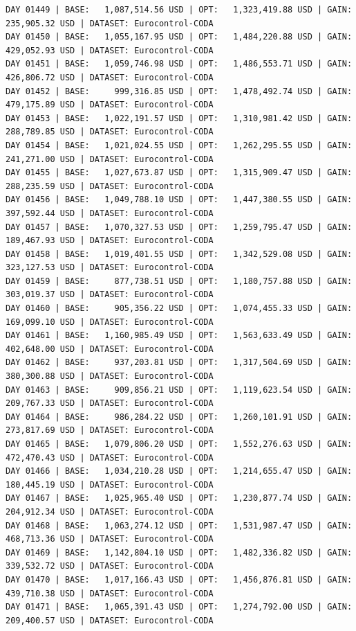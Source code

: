\documentclass[11pt,a4paper]{article}
\begin{document}
\begin{verbatim}
DAY 01449 | BASE:   1,087,514.56 USD | OPT:   1,323,419.88 USD | GAIN: 235,905.32 USD | DATASET: Eurocontrol-CODA
DAY 01450 | BASE:   1,055,167.95 USD | OPT:   1,484,220.88 USD | GAIN: 429,052.93 USD | DATASET: Eurocontrol-CODA
DAY 01451 | BASE:   1,059,746.98 USD | OPT:   1,486,553.71 USD | GAIN: 426,806.72 USD | DATASET: Eurocontrol-CODA
DAY 01452 | BASE:     999,316.85 USD | OPT:   1,478,492.74 USD | GAIN: 479,175.89 USD | DATASET: Eurocontrol-CODA
DAY 01453 | BASE:   1,022,191.57 USD | OPT:   1,310,981.42 USD | GAIN: 288,789.85 USD | DATASET: Eurocontrol-CODA
DAY 01454 | BASE:   1,021,024.55 USD | OPT:   1,262,295.55 USD | GAIN: 241,271.00 USD | DATASET: Eurocontrol-CODA
DAY 01455 | BASE:   1,027,673.87 USD | OPT:   1,315,909.47 USD | GAIN: 288,235.59 USD | DATASET: Eurocontrol-CODA
DAY 01456 | BASE:   1,049,788.10 USD | OPT:   1,447,380.55 USD | GAIN: 397,592.44 USD | DATASET: Eurocontrol-CODA
DAY 01457 | BASE:   1,070,327.53 USD | OPT:   1,259,795.47 USD | GAIN: 189,467.93 USD | DATASET: Eurocontrol-CODA
DAY 01458 | BASE:   1,019,401.55 USD | OPT:   1,342,529.08 USD | GAIN: 323,127.53 USD | DATASET: Eurocontrol-CODA
DAY 01459 | BASE:     877,738.51 USD | OPT:   1,180,757.88 USD | GAIN: 303,019.37 USD | DATASET: Eurocontrol-CODA
DAY 01460 | BASE:     905,356.22 USD | OPT:   1,074,455.33 USD | GAIN: 169,099.10 USD | DATASET: Eurocontrol-CODA
DAY 01461 | BASE:   1,160,985.49 USD | OPT:   1,563,633.49 USD | GAIN: 402,648.00 USD | DATASET: Eurocontrol-CODA
DAY 01462 | BASE:     937,203.81 USD | OPT:   1,317,504.69 USD | GAIN: 380,300.88 USD | DATASET: Eurocontrol-CODA
DAY 01463 | BASE:     909,856.21 USD | OPT:   1,119,623.54 USD | GAIN: 209,767.33 USD | DATASET: Eurocontrol-CODA
DAY 01464 | BASE:     986,284.22 USD | OPT:   1,260,101.91 USD | GAIN: 273,817.69 USD | DATASET: Eurocontrol-CODA
DAY 01465 | BASE:   1,079,806.20 USD | OPT:   1,552,276.63 USD | GAIN: 472,470.43 USD | DATASET: Eurocontrol-CODA
DAY 01466 | BASE:   1,034,210.28 USD | OPT:   1,214,655.47 USD | GAIN: 180,445.19 USD | DATASET: Eurocontrol-CODA
DAY 01467 | BASE:   1,025,965.40 USD | OPT:   1,230,877.74 USD | GAIN: 204,912.34 USD | DATASET: Eurocontrol-CODA
DAY 01468 | BASE:   1,063,274.12 USD | OPT:   1,531,987.47 USD | GAIN: 468,713.36 USD | DATASET: Eurocontrol-CODA
DAY 01469 | BASE:   1,142,804.10 USD | OPT:   1,482,336.82 USD | GAIN: 339,532.72 USD | DATASET: Eurocontrol-CODA
DAY 01470 | BASE:   1,017,166.43 USD | OPT:   1,456,876.81 USD | GAIN: 439,710.38 USD | DATASET: Eurocontrol-CODA
DAY 01471 | BASE:   1,065,391.43 USD | OPT:   1,274,792.00 USD | GAIN: 209,400.57 USD | DATASET: Eurocontrol-CODA

\end{verbatim}
\end{document}
